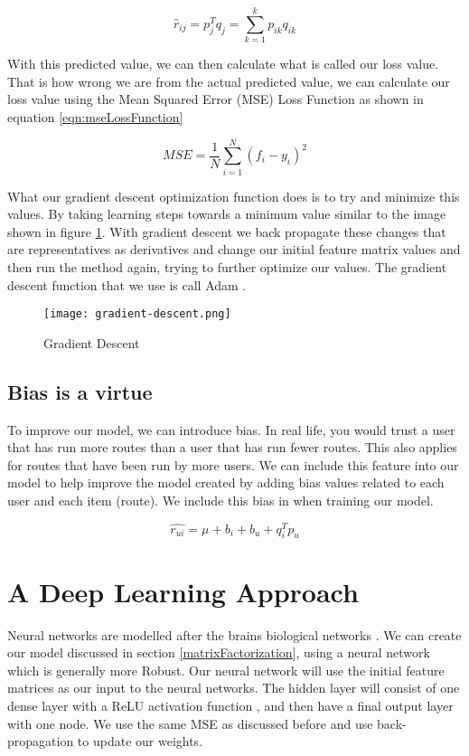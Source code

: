 \begin{equation}
    \hat{r}_{ij} = {p^{T}_{j}}{q_j}=\sum_{k=1}^{k}{p_{ik}q_{ik}}
\end{equation}

With this predicted value, we can then calculate what is called our loss value. That is how wrong we are from the actual predicted value, we can calculate our loss value using the Mean Squared Error (MSE) Loss Function as shown in equation \ref{eqn:mseLossFunction}

\begin{equation} \label{eqn:mseLossFunction}
    MSE = \frac{1}{N}\sum_{i=1}^{N}{({f_i}-{y_i})}^2 
\end{equation}

What our gradient descent optimization function does is to try and minimize this values. By taking learning steps towards a minimum value similar to the image shown in figure \ref{fig:gradientDescent}. With gradient descent we back propagate these changes that are representatives as derivatives and change our initial feature matrix values and then run the method again, trying to further optimize our values. The gradient descent function that we use is call Adam \cite{kingma2014adam}.

\begin{figure}[ht]
    \centering
    \texttt{[image: gradient-descent.png]}
    \caption{Gradient Descent}
    \label{fig:gradientDescent}
\end{figure}

\subsection{Bias is a virtue}
To improve our model, we can introduce bias. In real life, you would trust a user that has run more routes than a user that has run fewer routes. This also applies for routes that have been run by more users. We can include this feature into our model to help improve the model created by adding bias values related to each user and each item (route). We include this bias in when training our model.

\begin{equation}
    \hat{r_{ui}} = \mu + b_i + b_u + {q^{T}_{i}}{p_u}
\end{equation}

\section{A Deep Learning Approach} \label{neuralNetwork}
Neural networks are modelled after the brains biological networks \cite{van2018artificial}. We can create our model discussed in section \ref{matrixFactorization}, using a neural network which is generally more Robust. Our neural network will use the initial feature matrices as our input to the neural networks. The hidden layer will consist of one dense layer with a ReLU activation function \cite{li2017convergence}, and then have a final output layer with one node. We use the same MSE as discussed before and use back-propagation to update our weights.


